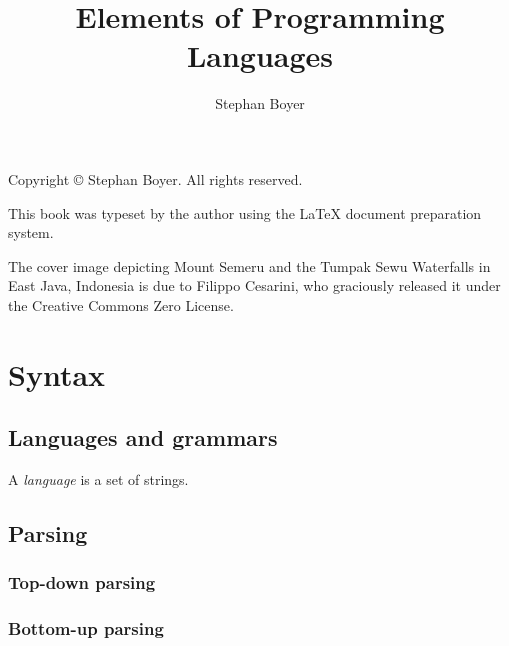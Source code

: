 \documentclass[12pt,oneside]{memoir}
\title{Elements of Programming Languages}
\author{Stephan Boyer}
\date{}
\begin{document}
  

  \frontmatter

  

  \maketitle

  \pagebreak
  \hspace{0pt}
  \vfill
    \noindent Copyright \copyright{} \the\year{} Stephan Boyer. All rights reserved.

    \bigbreak

    \noindent This book was typeset by the author using the \LaTeX{} document preparation system.

    \bigbreak

    \noindent The cover image depicting Mount Semeru and the Tumpak Sewu Waterfalls in East Java, Indonesia is due to Filippo Cesarini, who graciously released it under the Creative Commons Zero License.
  \vfill
  \hspace{0pt}
  \pagebreak

  

  \cleardoublepage
  \tableofcontents

  \mainmatter


  \part{Syntax}

    \chapter{Languages and grammars}

      A \emph{language} is a set of strings.

    \chapter{Parsing}

      \section{Top-down parsing}

      \section{Bottom-up parsing}
\end{document}
